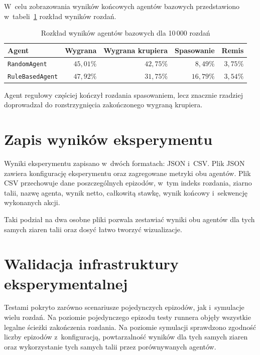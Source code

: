 W~celu zobrazowania wyników końcowych agentów bazowych przedstawiono w~tabeli~\ref{tab:baseline-outcomes} rozkład wyników rozdań.

\begin{table}[ht]
    \centering
    \caption{Rozkład wyników agentów bazowych dla 10\,000 rozdań}
    \label{tab:baseline-outcomes}
    \footnotesize
    \begin{tabular}{lrrrr}
        \hline
        Agent
        & Wygrana
        & Wygrana krupiera
        & Spasowanie
        & Remis \\
        \hline
        \texttt{RandomAgent}
        & $45{,}01\%$
        & $42{,}75\%$
        & $8{,}49\%$
        & $3{,}75\%$ \\
        \texttt{RuleBasedAgent}
        & $47{,}92\%$
        & $31{,}75\%$
        & $16{,}79\%$
        & $3{,}54\%$ \\
        \hline
    \end{tabular}
\end{table}

Agent regułowy częściej kończył rozdania spasowaniem, lecz znacznie rzadziej
doprowadzał do rozstrzygnięcia zakończonego wygraną krupiera.

\section{Zapis wyników eksperymentu}
\label{sec:zapis-wynikow-baseline}

Wyniki eksperymentu zapisano w~dwóch formatach: JSON i~CSV.
Plik JSON zawiera konfigurację eksperymentu oraz
zagregowane metryki obu agentów. Plik CSV przechowuje dane
poszczególnych epizodów, w~tym indeks rozdania, ziarno talii, nazwę
agenta, wynik netto, całkowitą stawkę, wynik końcowy i~sekwencję
wykonanych akcji.

Taki podział na dwa osobne pliki pozwala zestawiać wyniki obu agentów
dla tych samych ziaren talii oraz dosyć łatwo tworzyć wizualizacje.

\section{Walidacja infrastruktury eksperymentalnej}
\label{sec:walidacja-infrastruktury}

Testami pokryto zarówno scenariusze pojedynczych epizodów, jak
i~symulacje wielu rozdań. Na poziomie pojedynczego epizodu testy
runnera objęły wszystkie legalne ścieżki zakończenia rozdania. Na poziomie
symulacji sprawdzono zgodność liczby epizodów z~konfiguracją,
powtarzalność wyników dla tych samych ziaren oraz wykorzystanie tych samych talii przez porównywanych agentów.

